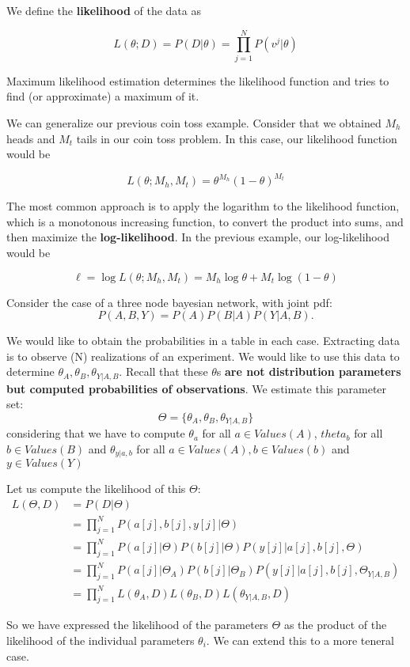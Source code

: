 We define the \textbf{likelihood} of the data as

\[
L(\theta;D) = P(D|\theta) = \prod_{j=1}^N P(v^j|\theta)
\]

Maximum likelihood estimation determines the likelihood function and
tries to find (or approximate) a maximum of it.

We can generalize our previous coin toss example. Consider that we
obtained \(M_h\) heads and \(M_t\) tails in our coin toss problem. In
this case, our likelihood function would be

\[
L(\theta; M_h,M_t) = \theta^{M_h} (1-\theta)^{M_t}
\]

The most common approach is to apply the logarithm to the likelihood
function, which is a monotonous increasing function, to convert the
product into sums, and then maximize the \textbf{log-likelihood}. In the
previous example, our log-likelihood would be

\[
\ell = \log L(\theta; M_h,M_t) = M_h \log \theta + M_t \log (1-\theta)
\]

Consider the case of a three node bayesian network, with joint pdf: \[
P(A,B,Y) = P(A)P(B|A)P(Y|A,B).
\]

We would like to obtain the probabilities in a table in each case.
Extracting data is to observe (N) realizations of an experiment. We
would like to use this data to determine
\(\theta_A,\theta_B,\theta_{Y|A,B}\). Recall that these \(\theta\)s
\textbf{are not distribution parameters but computed probabilities of
observations}. We estimate this parameter set: \[
\Theta = \{\theta_A,\theta_B,\theta_{Y|A,B}\}
\] considering that we have to compute \(\theta_a\) for all
\(a \in Values(A)\), \(theta_b\) for all \(b \in Values(B)\) and
\(\theta_{y|a,b}\) for all \(a\in Values(A), b \in Values(b)\) and
\(y \in Values(Y)\)

Let us compute the likelihood of this \(\Theta\): \begin{align*}
L(\Theta,D) & = P(D|\Theta) \\
& = \prod_{j=1}^N P(a[j],b[j],y[j]|\Theta) \\
& = \prod_{j=1}^N P(a[j]|\Theta) P(b[j]|\Theta)P(y[j]|a[j],b[j],\Theta)\\
& = \prod_{j=1}^N P(a[j]|\Theta_A) P(b[j]| \Theta_B)P(y[j] | a[j],b[j],\Theta_{Y|A,B})\\
& = \prod_{j=1}^N L(\theta_A,D) L(\theta_B,D) L(\theta_{Y|A,B},D)
\end{align*}

So we have expressed the likelihood of the parameters \(\Theta\) as the
product of the likelihood of the individual parameters \(\theta_i\). We
can extend this to a more teneral case.

